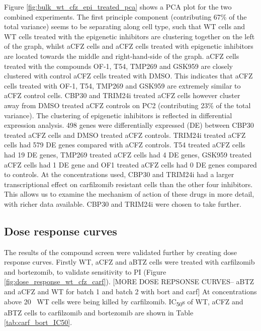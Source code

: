 Figure \ref{fig:bulk_wt_cfz_epi_treated_pca} shows a PCA plot for the two combined experiments.
The first principle component (contributing 67\% of the total variance) seems to be separating along cell type, such that WT cells and WT cells treated with the epigenetic inhibitors are clustering together on the left of the graph, whilst aCFZ cells and aCFZ cells treated with epigenetic inhibitors are located towards the middle and right-hand-side of the graph.
aCFZ cells treated with the compounds OF-1, T54, TMP269 and GSK959 are closely clustered with control aCFZ cells treated with DMSO.
This indicates that aCFZ cells treated with OF-1, T54, TMP269 and GSK959 are extremely similar to aCFZ control cells.
CBP30 and TRIM24i treated aCFZ cells however cluster away from DMSO treated aCFZ controls on PC2 (contributing 23\% of the total variance).
The clustering of epigenetic inhibitors is reflected in differential expression analysis.
498 genes were differentially expressed (DE) between CBP30 treated aCFZ cells and DMSO treated aCFZ controls.
TRIM24i treated aCFZ cells had 579 DE genes compared with aCFZ controls.
T54 treated aCFZ cells had 19 DE genes, TMP269 treated aCFZ cells had 4 DE genes, GSK959 treated aCFZ cells had 1 DE gene and OF1 treated aCFZ cells had 0 DE genes compared to controls.
At the concentrations used, CBP30 and TRIM24i had a larger transcriptional effect on carfilzomib resistant cells than the other four inhibitors.
This allows us to examine the mechanism of action of these drugs in more detail, with richer data available.
CBP30 and TRIM24i were chosen to take further.


\subsection{Dose response curves}\label{subsec:dose_response}
The results of the compound screen were validated further by creating dose response curves.
Firstly WT, aCFZ and aBTZ cells were treated with carfilzomib and bortezomib, to validate sensitivity to PI (Figure \ref{fig:dose_response_wt_cfz_carf}).
[MORE DOSE REPSONSE CURVES-- aBTZ and aCFZ and WT for batch 1 and batch 2 with bort and carf]
At concentrations above 20\si{\nano\Molar} WT cells were being killed by carfilzomib.
IC\textsubscript{50}s of WT, aCFZ and aBTZ cells to carfilzomib and bortezomib are shown in Table \ref{tab:carf_bort_IC50}.

